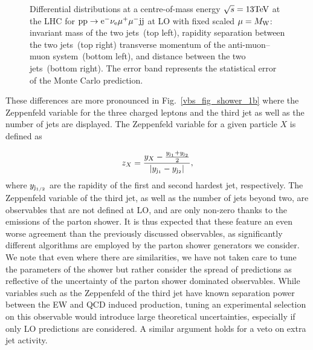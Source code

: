 \documentclass[11pt]{cernrep}
\begin{document}
\begin{figure}[htbp]
\begin{center}
\caption{Differential distributions at a centre-of-mass energy $\sqrt{s}=13{\rm TeV}$ at the LHC for ${\rm p} {\rm p}
  \to {\rm e}^-  \nu_{\rm e}  \mu^+ \mu^- {\rm j} {\rm j}$ at LO with fixed scaled $\mu = M_{\rm W}$: 
                invariant mass of the two jets~(top left),
                rapidity separation between the two jets~(top right)
                transverse momentum of the anti-muon--muon system~(bottom left), and
                distance between the two jets~(bottom right). The error band represents
                the statistical error of the Monte Carlo prediction. }
\label{vbs_fig_shower_1a}
\end{center}
\end{figure}

These differences are more pronounced in Fig.~\ref{vbs_fig_shower_1b} where the Zeppenfeld variable for the three charged leptons and the third jet as well as the number of jets are displayed.
The Zeppenfeld variable for a given particle $X$ is defined as

\begin{equation}
  z_{X} = \frac{y_{X}-\frac{y_{{\rm j}_1}+y_{{\rm j}_2}}2}{|y_{{\rm j}_1}-y_{{\rm j}_2}|} ,
\end{equation}
%
where $y_{{\rm j}_{1/2}}$ are the rapidity of the first and second hardest jet, respectively.
The Zeppenfeld variable of the third jet, as well as the number of jets beyond two, are observables that are not defined at LO,
and are only non-zero thanks to the emissions of the parton shower.
It is thus expected that these feature an even worse agreement than the previously discussed observables, as 
significantly different algorithms are employed by the parton shower generators we consider. 
We note that even where there are similarities, we have not taken care to tune the parameters
of the shower but rather consider the spread of predictions as reflective of the uncertainty 
of the parton shower dominated observables. While variables such as the Zeppenfeld of the third jet
have known separation power between the EW and QCD induced production, tuning an experimental selection 
on this observable would introduce large theoretical uncertainties, especially if only LO predictions
are considered. A similar argument holds for a veto on extra jet activity.
\end{document}
